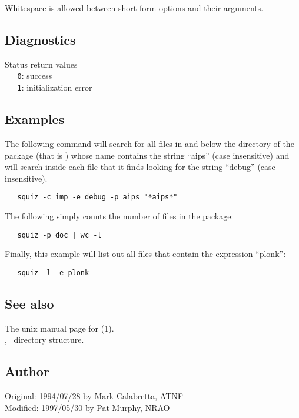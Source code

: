 \noindent
Whitespace is allowed between short-form options and their arguments.

\subsection*{Diagnostics}

Status return values
\\ \verb+   0+:  success
\\ \verb+   1+:  initialization error

\subsection*{Examples}

The following command will search for all files in and below the
 directory of the  package (that is
) whose name contains the string ``aips'' (case
insensitive) and will search inside each file that it finds looking for the
string ``debug'' (case insensitive).

\begin{verbatim}
   squiz -c imp -e debug -p aips "*aips*"
\end{verbatim}

\noindent
The following simply counts the number of files in the  package:

\begin{verbatim}
   squiz -p doc | wc -l
\end{verbatim}

\noindent
Finally, this example will list out all files that contain the expression
``plonk'':

\begin{verbatim}
   squiz -l -e plonk
\end{verbatim}

\subsection*{See also}

The unix manual page for (1).\\
, \aipspp\ directory structure.

\subsection*{Author}

Original: 1994/07/28 by Mark Calabretta, ATNF\\
Modified: 1997/05/30 by Pat Murphy, NRAO

